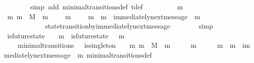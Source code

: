 \begin{isabellebody}
\ \ \ \ \ \ \isamarkupfalse%
\ {\isacharparenleft}simp\ add{\isacharcolon}\ minimal{\isacharunderscore}transitions{\isacharunderscore}def\ {\isasymSigma}t{\isacharunderscore}def{\isacharparenright}\isanewline
\ \ \ \ \isamarkupfalse%
\ \isamarkupfalse%
\ {\isachardoublequoteopen}{\isasymsigma}\ {\isasymunion}\ {\isacharbraceleft}m{}{\isacharbraceright}\ {\isasymin}\ {\isasymSigma}{\isachardoublequoteclose}\isanewline
\ \ \ \ \ \ \isamarkupfalse%
\ {\isacartoucheopen}{\isacharbraceleft}m{}{\isacharcomma}\ m{}{\isacharbraceright}\ {\isasymsubseteq}\ M\ {\isasymand}\ m{}\ {\isasymin}\ {\isasymsigma}{\isacharprime}{\isacharminus}\ {\isasymsigma}\ {\isasymand}\ m{}\ {\isasymin}\ {\isasymsigma}{\isacharprime}{\isacharminus}\ {\isasymsigma}\ {\isasymand}\ m{}\ {\isasymnoteq}\ m{}\ {\isasymand}\ immediately{\isacharunderscore}next{\isacharunderscore}message\ {\isacharparenleft}{\isasymsigma}{\isacharcomma}\ m{}{\isacharparenright}{\isacartoucheclose}\isanewline
\ \ \ \ \ \ \ \ \ \ \ \ state{\isacharunderscore}transition{\isacharunderscore}by{\isacharunderscore}immediately{\isacharunderscore}next{\isacharunderscore}message\isanewline
\ \ \ \ \ \ \isamarkupfalse%
\ simp\isanewline
\ \ \ \ \isamarkupfalse%
\ {\isachardoublequoteopen}is{\isacharunderscore}future{\isacharunderscore}state\ {\isacharparenleft}{\isasymsigma}{\isacharcomma}\ {\isasymsigma}\ {\isasymunion}\ {\isacharbraceleft}m{}{\isacharbraceright}{\isacharparenright}\ {\isasymand}\ is{\isacharunderscore}future{\isacharunderscore}state\ {\isacharparenleft}{\isasymsigma}\ {\isasymunion}\ {\isacharbraceleft}m{}{\isacharbraceright}{\isacharcomma}\ {\isasymsigma}{\isacharprime}{\isacharparenright}{\isachardoublequoteclose}\isanewline
\ \ \ \ \ \ \isamarkupfalse%
\ {\isacartoucheopen}{\isacharparenleft}{\isasymsigma}{\isacharcomma}\ {\isasymsigma}{\isacharprime}{\isacharparenright}\ {\isasymin}\ minimal{\isacharunderscore}transitions\ {\isasymand}\ {\isasymnot}\ is{\isacharunderscore}singleton\ {\isacharparenleft}{\isasymsigma}{\isacharprime}\ {\isacharminus}\ {\isasymsigma}{\isacharparenright}{\isacartoucheclose}\ {\isacartoucheopen}{\isacharbraceleft}m{}{\isacharcomma}\ m{}{\isacharbraceright}\ {\isasymsubseteq}\ M\ {\isasymand}\ m{}\ {\isasymin}\ {\isasymsigma}{\isacharprime}\ {\isacharminus}\ {\isasymsigma}\ {\isasymand}\ m{}\ {\isasymin}\ {\isasymsigma}{\isacharprime}\ {\isacharminus}\ {\isasymsigma}\ {\isasymand}\ m{}\ {\isasymnoteq}\ m{}\ {\isasymand}\ immediately{\isacharunderscore}next{\isacharunderscore}message\ {\isacharparenleft}{\isasymsigma}{\isacharcomma}\ m{}{\isacharparenright}{\isacartoucheclose}\ minimal{\isacharunderscore}transitions{\isacharunderscore}def\ \isamarkupfalse%

\end{isabellebody}
